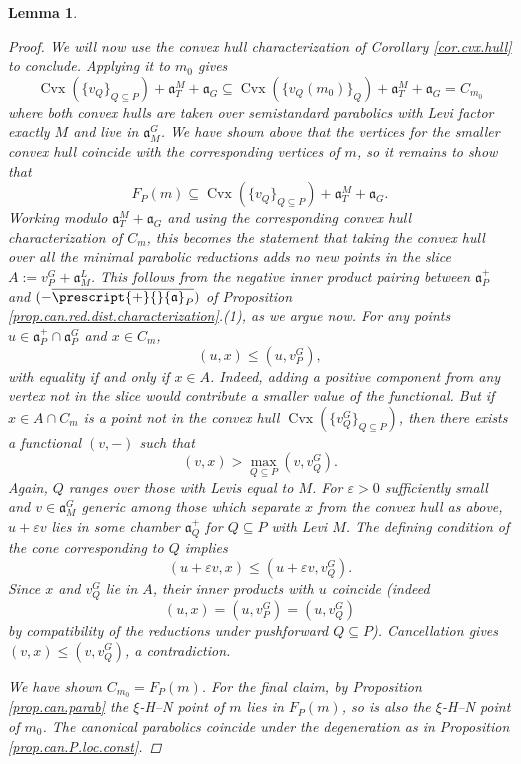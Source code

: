 \documentclass[openany]{amsbook}
\newtheorem{lemma}[theorem]{Lemma}
\theoremstyle{definition}
\theoremstyle{remark}
\numberwithin{equation}{section}
\newcommand{\ol}[1]{\overline{#1}}
\renewcommand{\epsilon}{\varepsilon}
\renewcommand{\-}{\operatorname{-}}
\newcommand{\Cvx}{\operatorname{Cvx}}
\renewcommand{\a}{\mathfrak{a}}
\newcommand{\obtcone}{\prescript{+}{}{\a}}
\newcommand{\narcone}{\a^+}
\begin{document}
\begin{lemma}
\begin{proof}
        We will now use the convex hull characterization of Corollary \ref{cor.cvx.hull} to conclude. Applying it to $m_0$ gives
        $$
                \Cvx(\{v_Q\}_{Q \subseteq P}) + \a_T^M + \a_G \subseteq \Cvx(\{v_Q(m_0)\}_{Q}) + \a_T^M + \a_G = C_{m_0}
        $$
        where both convex hulls are taken over semistandard parabolics with Levi factor exactly $M$ and live in $\a_M^G$. We have shown above that the vertices for the smaller convex hull coincide with the corresponding vertices of $m$, so it remains to show that 
        $$F_P(m) \subseteq \Cvx(\{v_Q\}_{Q \subseteq P}) + \a_T^M + \a_G.$$ Working modulo $\a_T^M + \a_G$ and using the corresponding convex hull characterization of $C_m$, this becomes the statement that taking the convex hull over \textit{all} the minimal parabolic reductions adds no new points in the slice $A := v_P^G + \a_M^L$.
        This follows from the negative inner product pairing between $\narcone_P$ and $(- \ol{\obtcone_P})$ of Proposition \ref{prop.can.red.dist.characterization}.(1), as we argue now. For any points $u \in \narcone_P \cap \a_P^G$ and $x \in C_m$,
        $$
            (u, x) \le (u, v_P^G),
        $$
        with equality if and only if $x \in A$. Indeed, adding a positive component from any vertex not in the slice would contribute a smaller value of the functional. But if $x \in A \cap C_m$ is a point not in the convex hull $ \Cvx(\{v_Q^G\}_{Q \subseteq P})$, then there exists a functional $(v, -)$ such that
        $$
            (v,x) > \max_{Q \subseteq P} (v, v_Q^G).
        $$
        Again, $Q$ ranges over those with Levis equal to $M$. For $\epsilon > 0$ sufficiently small and $v \in \a_M^G$ generic among those which separate $x$ from the convex hull as above, $u + \epsilon v$ lies in some chamber $\narcone_Q$ for $Q \subseteq P$ with Levi $M$. The defining condition of the cone corresponding to $Q$ implies
        $$
            (u + \epsilon v, x) \le (u + \epsilon v, v_Q^G).
        $$
        Since $x$ and $v_Q^G$ lie in $A$, their inner products with $u$ coincide (indeed
        $$
            (u,x) = (u, v_P^G) = (u, v_Q^G)
        $$
        by compatibility of the reductions under pushforward $Q \subseteq P$). Cancellation gives $(v,x) \le (v, v_Q^G)$, a contradiction.

        We have shown $C_{m_0} = F_P(m)$. For the final claim, by Proposition \ref{prop.can.parab} the $\xi$-H--N point of $m$ lies in $F_P(m)$, so is also the $\xi$-H--N point of $m_0$. The canonical parabolics coincide under the degeneration as in Proposition \ref{prop.can.P.loc.const}.
    \end{proof}
\end{lemma}
\end{document}
